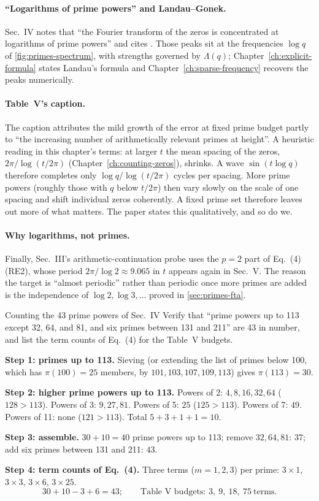 \paragraph{``Logarithms of prime powers'' and Landau--Gonek.} Sec.~IV notes that ``the Fourier transform of the zeros is concentrated at logarithms of prime powers'' and cites \cite{landau,gonek}. Those peaks sit at the frequencies $\log q$ of \cref{fig:primes-spectrum}, with strengths governed by $\Lambda(q)$; Chapter~\ref{ch:explicit-formula} states Landau's formula and Chapter~\ref{ch:sparse-frequency} recovers the peaks numerically.

\paragraph{Table~V's caption.} The caption attributes the mild growth of the error at fixed prime budget partly to ``the increasing number of arithmetically relevant primes at height''. A heuristic reading in this chapter's terms: at larger $t$ the mean spacing of the zeros, $2\pi/\log(t/2\pi)$ (Chapter~\ref{ch:counting-zeros}), shrinks. A wave $\sin(t\log q)$ therefore completes only $\log q/\log(t/2\pi)$ cycles per spacing. More prime powers (roughly those with $q$ below $t/2\pi$) then vary slowly on the scale of one spacing and shift individual zeros coherently. A fixed prime set therefore leaves out more of what matters. The paper states this qualitatively, and so do we.

\paragraph{Why logarithms, not primes.} Finally, Sec.~III's arithmetic-continuation probe uses the $p=2$ part of Eq.~(4) (RE2), whose period $2\pi/\log2\approx9.065$ in $t$ appears again in Sec.~V. The reason the target is ``almost periodic'' rather than periodic once more primes are added is the independence of $\log2,\log3,\dots$ proved in \cref{sec:primes-fta}.

\begin{sample}{Counting the 43 prime powers of Sec.~IV}
Verify that ``prime powers up to 113 except 32, 64, and 81, and six primes between 131 and 211'' are 43 in number, and list the term counts of Eq.~(4) for the Table~V budgets.

\textbf{Step 1: primes up to 113.} Sieving (or extending the list of primes below 100, which has $\pi(100)=25$ members, by $101,103,107,109,113$) gives $\pi(113)=30$.

\textbf{Step 2: higher prime powers up to 113.} Powers of 2: $4,8,16,32,64$ ($128>113$). Powers of 3: $9,27,81$. Powers of 5: $25$ ($125>113$). Powers of 7: $49$. Powers of 11: none ($121>113$). Total $5+3+1+1=10$.

\textbf{Step 3: assemble.} $30+10=40$ prime powers up to 113; remove $32,64,81$: $37$; add six primes between 131 and 211: $43$.

\textbf{Step 4: term counts of Eq.~(4).} Three terms ($m=1,2,3$) per prime: $3\times1$, $3\times3$, $3\times6$, $3\times25$.
\[
\boxed{30+10-3+6=43;\qquad \text{Table V budgets: } 3,\ 9,\ 18,\ 75\ \text{terms}.}
\]
\end{sample}

